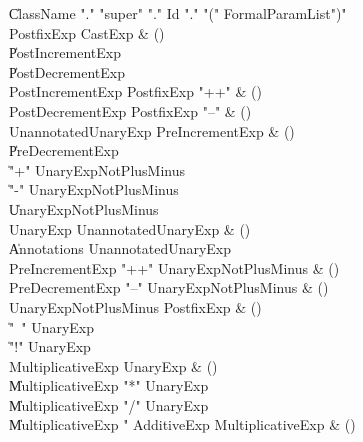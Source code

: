 \begin{bbgrammar}

    \| ClassName \xcd"." \xcd"super"  \xcd"." Id \xcd"." \xcd"(" FormalParamList\opt \xcd")"\\
 PostfixExp  \label{prod:PostfixExp}  \: CastExp & ()\\
    \| PostIncrementExp\\
    \| PostDecrementExp\\
 PostIncrementExp  \label{prod:PostIncrementExp}  \: PostfixExp \xcd"++" & ()\\
 PostDecrementExp  \label{prod:PostDecrementExp}  \: PostfixExp \xcd"--" & ()\\
 UnannotatedUnaryExp  \label{prod:UnannotatedUnaryExp}  \: PreIncrementExp & ()\\
    \| PreDecrementExp\\
    \| \xcd"+" UnaryExpNotPlusMinus\\
    \| \xcd"-" UnaryExpNotPlusMinus\\
    \| UnaryExpNotPlusMinus\\
 UnaryExp  \label{prod:UnaryExp}  \: UnannotatedUnaryExp & ()\\
    \| Annotations UnannotatedUnaryExp\\
 PreIncrementExp  \label{prod:PreIncrementExp}  \: \xcd"++" UnaryExpNotPlusMinus & ()\\
 PreDecrementExp  \label{prod:PreDecrementExp}  \: \xcd"--" UnaryExpNotPlusMinus & ()\\
 UnaryExpNotPlusMinus  \label{prod:UnaryExpNotPlusMinus}  \: PostfixExp & ()\\
    \| \xcd"~" UnaryExp\\
    \| \xcd"!" UnaryExp\\
 MultiplicativeExp  \label{prod:MultiplicativeExp}  \: UnaryExp & ()\\
    \| MultiplicativeExp \xcd"*" UnaryExp\\
    \| MultiplicativeExp \xcd"/" UnaryExp\\
    \| MultiplicativeExp \xcd"%
 AdditiveExp  \label{prod:AdditiveExp}  \: MultiplicativeExp & ()\\

\end{bbgrammar}
